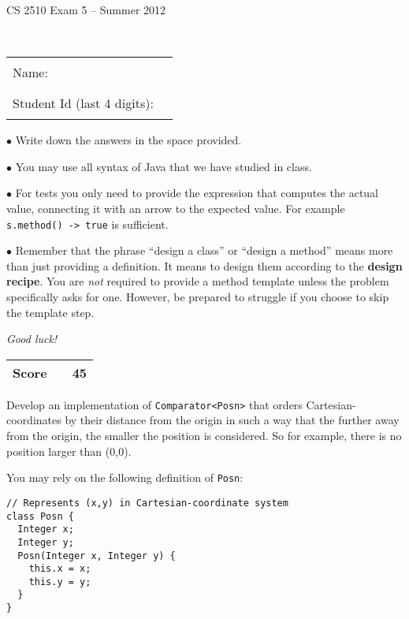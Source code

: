 \documentclass[11pt]{article}
\newcommand\code[1]{\texttt{#1}}
\def\pts#1{\marginpar{\footnotesize \raggedright  \fbox{#1 {\sc Points}}}}
\newcounter{Pctr}
\newenvironment{problem}{\stepcounter{Pctr}%
\begin{description}
\item[\noindent{\bf Problem} \arabic{Pctr}] 
\end{description}}{\relax}
\begin{document}
\renewcommand{\theenumi}{\Alph{enumi}}
\setcounter{Pctr}{0}


\vfill
\centerline{\Large CS 2510 Exam 5 -- Summer 2012}

~\\[2cm]

\begin{center}
\begin{tabular}{l@{\qquad}l}
Name:                        & \rule{200pt}{.1pt} \\[.5cm]
Student Id (last 4 digits):  & \rule{200pt}{.1pt} \\[.5cm]
\end{tabular}
\end{center}

\noindent\begin{minipage}{7.5cm} $\bullet$ Write down the answers in the
space provided. 

$\bullet$ You may use all syntax of Java that we have studied in
class.

$\bullet$ For tests you only need to provide the expression that
computes the actual value, connecting it with an arrow to the expected
value. For example \code{s.method() -> true} is sufficient.

$\bullet$ Remember that the phrase ``design a class'' or ``design a
method'' means more than just providing a definition. It means to
design them according to the \textbf{design recipe}.  You are
\textit{not} required to provide a method template unless the problem
specifically asks for one.  However, be prepared to struggle if you
choose to skip the template step.

\bigskip

\textit{Good luck!}
\end{minipage}\hfil\begin{minipage}[t]{4.5cm}
\begin{tabular}{|c|l@{\qquad\qquad}|r|}
\hline
\textbf{Score} &  & 45 \\ \hline
\end{tabular}
\end{minipage}

\vfill\thispagestyle{empty}
\newpage

\pts{45}
\begin{problem}
Develop an implementation of {\tt Comparator<Posn>} that orders
Cartesian-coordinates by their distance from the origin in such a way
that the further away from the origin, the smaller the position is
considered.  So for example, there is no position larger than (0,0).

You may rely on the following definition of {\tt Posn}:

\begin{verbatim}
// Represents (x,y) in Cartesian-coordinate system
class Posn {
  Integer x;
  Integer y;
  Posn(Integer x, Integer y) {
    this.x = x;
    this.y = y;
  }
}
\end{verbatim}
\end{problem}
\end{document}
